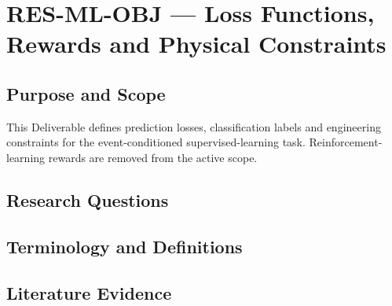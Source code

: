 
\section{RES-ML-OBJ --- Loss Functions, Rewards and Physical Constraints}
\label{sec:res-ml-obj}

\subsection{Purpose and Scope}
\label{sec:res-ml-obj-purpose}

This Deliverable defines prediction losses, classification labels and
engineering constraints for the event-conditioned supervised-learning task.
Reinforcement-learning rewards are removed from the active scope.

\subsection{Research Questions}
\label{sec:res-ml-obj-research-questions}


\subsection{Terminology and Definitions}
\label{sec:res-ml-obj-definitions}


\subsection{Literature Evidence}
\label{sec:res-ml-obj-literature-evidence}

%

